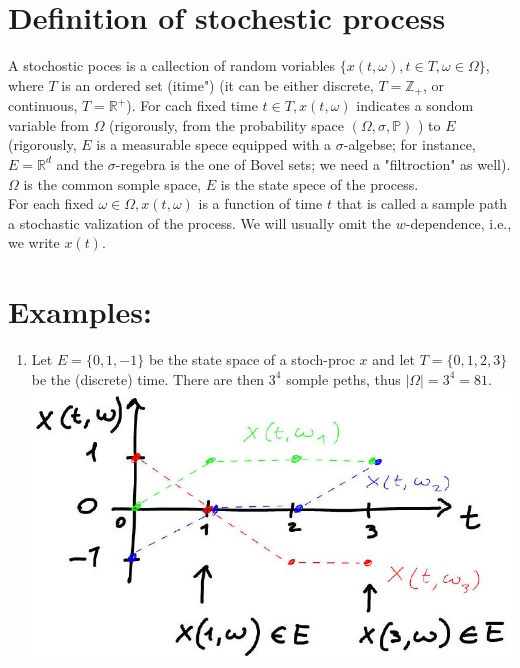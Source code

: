 \documentclass[10pt]{article}
\begin{document}
\section*{Definition of stochestic process}
A stochostic poces is a callection of random voriables $\{x(t, \omega), t \in T, \omega \in \Omega\}$, where $T$ is an ordered set (itime") (it can be either discrete, $T=\mathbb{Z}_{+}$, or continuous, $T=\mathbb{R}^{+}$). For cach fixed time $t \in T, x(t, \omega)$ indicates a sondom variable from $\Omega$ (rigorously, from the probability space $(\Omega, \sigma, \mathbb{P})$ ) to $E$ (rigorously, $E$ is a measurable spece equipped with a $\sigma$-algebse; for instance, $E=\mathbb{R}^{d}$ and the $\sigma$-regebra is the one of Bovel sets; we need a "filtroction" as well).\\
$\Omega$ is the common somple space, $E$ is the state spece of the process.\\
For each fixed $\omega \in \Omega, x(t, \omega)$ is a function of time $t$ that is called a sample path a stochastic valization of the process. We will usually omit the $w$-dependence, i.e., we write $x(t)$.

\section*{Examples:}
\begin{enumerate}
  \item Let $E=\{0,1,-1\}$ be the state space of a stoch-proc $x$ and let $T=\{0,1,2,3\}$ be the (discrete) time. There are then $3^{4}$ somple peths, thus $|\Omega|=3^{4}=81$.\\
\includegraphics[max width=\textwidth, center]{2025_10_17_79731b7d4e7690819b81g-03}
\end{enumerate}
\end{document}
